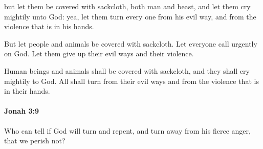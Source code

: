 			\begin{versebox}
					\item[BHS] 
					\item[LXX] 
					\item[ASV] but let them be covered with sackcloth, both man and beast, and let them cry mightily unto God: yea, let them turn every one from his evil way, and from the violence that is in his hands.
					\item[NIV] But let people and animals be covered with sackcloth. Let everyone call urgently on God. Let them give up their evil ways and their violence.
					\item[NRSV] Human beings and animals shall be covered with sackcloth, and they shall cry mightily to God. All shall turn from their evil ways and from the violence that is in their hands.
			\end{versebox}

		\paragraph{Jonah 3:9} %
			\label{JONAH-3-9}

			Who can tell if God will turn and repent, and turn away from his fierce anger, that we perish not?

